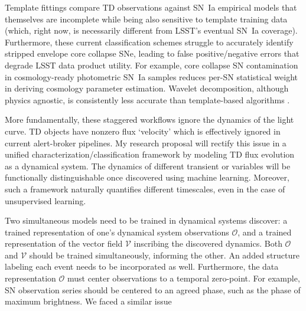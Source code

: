 \documentclass[modern]{aastex631}
\begin{document}
Template fittings compare TD observations against SN~Ia empirical models that themselves are incomplete while being also sensitive to template training data (which, right now, is necessarily different from LSST's eventual SN~Ia coverage). 
Furthermore, these current classification schemes struggle to accurately identify stripped envelope core collapse SNe, leading to false positive/negative errors that degrade LSST data product utility. 
For example, core collapse SN contamination in cosmology-ready photometric SN~Ia samples reduces per-SN statistical weight in deriving cosmology parameter estimation. 
Wavelet decomposition, although physics agnostic, is consistently less accurate than template-based algorithms \citep{Malz2019}. 

More fundamentally, these staggered workflows ignore the dynamics of the light curve. 
TD objects have nonzero flux `velocity' which is effectively ignored in current alert-broker pipelines. 
My research proposal will rectify this issue in a unified characterization/classification framework by modeling TD flux evolution as a dynamical system. 
The dynamics of different transient or variables will be functionally distinguishable once discovered using machine learning. 
Moreover, such a framework naturally quantifies different timescales, even in the case of unsupervised learning. 

Two simultaneous models need to be trained in dynamical systems discover: a  trained representation of one's dynamical system observations $\mathcal{O}$, and a trained representation of the vector field $\mathcal{V}$ inscribing the discovered dynamics. 
Both $\mathcal{O}$ and $\mathcal{V}$ should be trained simultaneously, informing the other. 
An added structure labeling each event needs to be incorporated as well. 
Furthermore, the data representation $\mathcal{O}$ must center observations to a temporal zero-point. 
For example, SN observation series should be centered to an agreed phase, such as the phase of maximum brightness. 
We faced a similar issue 




{}

\end{document}
